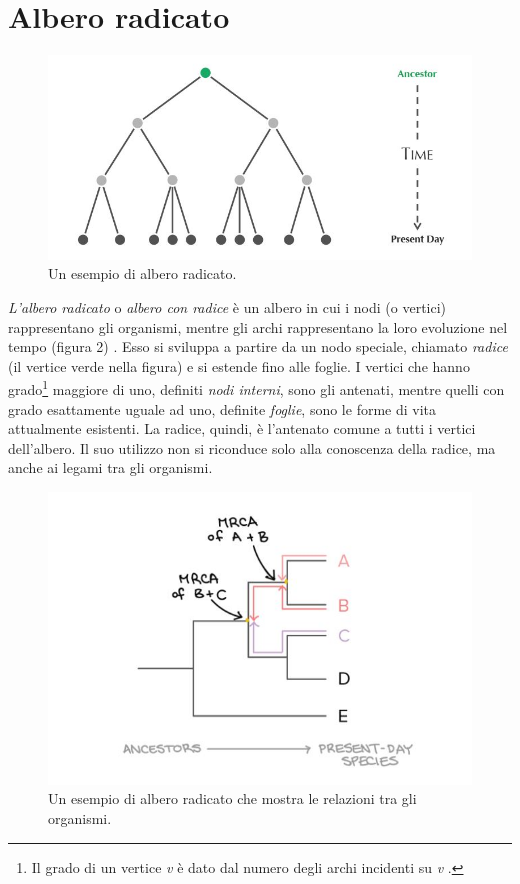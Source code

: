 \section{Albero radicato}
\begin{figure}[h!]
	\includegraphics[width=\linewidth]{rooted_tree.jpg}
 	\caption{Un esempio di albero radicato.}
  	\label{fig:RootedTree}
\end{figure}
\textit{L'albero radicato} o \textit{albero con radice} è un albero in cui i nodi (o vertici) rappresentano gli organismi, mentre gli archi rappresentano la loro evoluzione nel tempo (figura 2) \cite{bioinfalganactivelearningapproachparttwo}. Esso si sviluppa a partire da un nodo speciale, chiamato \textit{radice} (il vertice verde nella figura) e si estende fino alle foglie. I vertici che hanno grado\footnote{Il grado di un vertice \textit{v} è dato dal numero degli archi incidenti su \textit{v} \cite{algoritmiEStruttureDati2}.} maggiore di uno, definiti \textit{nodi interni}, sono gli antenati, mentre quelli con grado esattamente uguale ad uno, definite \textit{foglie}, sono le forme di vita attualmente esistenti. La radice, quindi, è l'antenato comune a tutti i vertici dell'albero.
\newline
Il suo utilizzo non si riconduce solo alla conoscenza della radice, ma anche ai legami tra gli organismi.
\newline
\begin{figure}[h!]
	\includegraphics[width=\linewidth]{rooted_tree_2.jpg}
 	\caption{Un esempio di albero radicato che mostra le relazioni tra gli organismi.}
  	\label{fig:RootedTree}
\end{figure}
